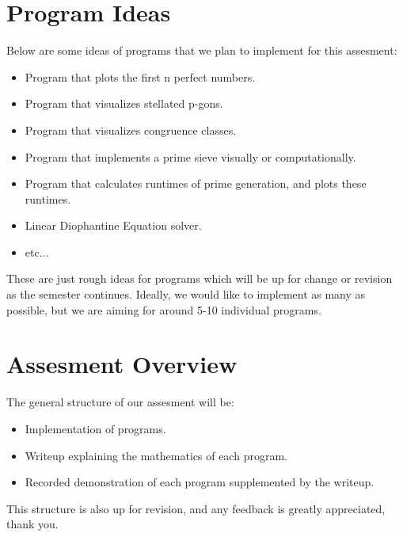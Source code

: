 \documentclass[11pt]{article}
\begin{document}
\section*{Program Ideas}
Below are some ideas of programs that we plan to implement for this assesment:
\begin{itemize}
\item Program that plots the first n perfect numbers.
\item Program that visualizes stellated p-gons.
\item Program that visualizes congruence classes.
\item Program that implements a prime sieve visually or computationally.
\item Program that calculates runtimes of prime generation, and plots these runtimes.
\item Linear Diophantine Equation solver.
\item etc...
\end{itemize}
These are just rough ideas for programs which will be up for change or revision as the semester continues.
Ideally, we would like to implement as many as possible, but we are aiming for around 5-10 individual programs.
\section*{Assesment Overview}
The general structure of our assesment will be:
\begin{itemize}
\item Implementation of programs.
\item Writeup explaining the mathematics of each program.
\item Recorded demonstration of each program supplemented by the writeup.
\end{itemize}
This structure is also up for revision, and any feedback is greatly appreciated, thank you.
\end{document}
